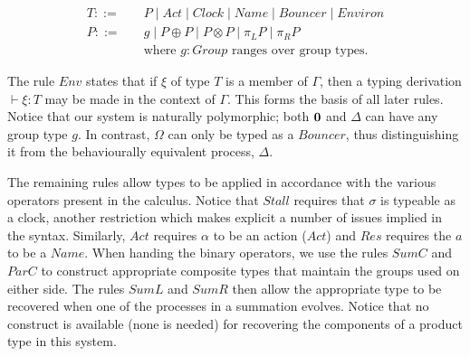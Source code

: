 \begin{equation*}
\label{eqn:tnt:typesyntax}
\begin{aligned}
T \mathrel{::=} & \quad P \mid Act \mid Clock \mid Name \mid Bouncer \mid
 Environ \\
P \mathrel{::=} & \quad g \mid P \oplus P \mid P \otimes P \mid \pi_L P \mid
 \pi_R P \\
                & \quad \text{where $g \colon Group$ ranges over group types.}
\end{aligned}
\end{equation*}

The rule $Env$ states that if $\xi$ of type $T$ is a member of
$\Gamma$, then a typing derivation $\vdash \xi : T$ may be made in the
context of $\Gamma$.  This forms the basis of all later rules.  Notice
that our system is naturally polymorphic; both $\textbf{0}$ and $\Delta$ can
have any group type $g$.  In contrast, $\Omega$ can only be typed as a
$Bouncer$, thus distinguishing it from the behaviourally equivalent
process, $\Delta$.  

The remaining rules allow types to be applied in accordance with the
various operators present in the calculus.  Notice that $Stall$ requires
that $\sigma$ is typeable as a clock, another restriction which makes
explicit a number of issues implied in the syntax.  Similarly, $Act$
requires $\alpha$ to be an action ($Act$) and $Res$ requires the $a$ to
be a $Name$.  When handing the binary operators, we use the rules $SumC$
and $ParC$ to construct appropriate composite types that maintain the
groups used on either side.  The rules $SumL$ and $SumR$ then allow the
appropriate type to be recovered when one of the processes in a
summation evolves.  Notice that no construct is available (none is
needed) for recovering the components of a product type in this system.

